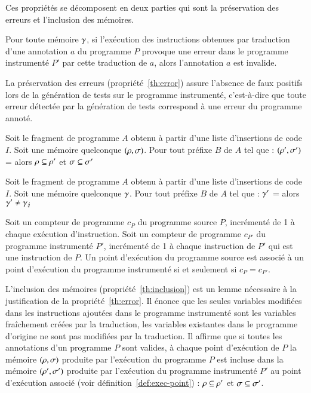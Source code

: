 Ces propriétés se décomposent en deux parties qui sont la préservation des
erreurs et l'inclusion des mémoires.

\begin{myproperty}
  \label{th:error}
  Pour toute mémoire $\gamma$, si l'exécution des instructions obtenues
  par traduction d'une annotation $a$
  du programme $P$ provoque une erreur dans le programme instrumenté $P'$ par
  cette traduction de $a$, alors l'annotation $a$ est invalide.
\end{myproperty}

La préservation des erreurs (propriété~\ref{th:error}) assure l'absence de faux
positifs lors de la génération de tests sur le programme instrumenté,
c'est-à-dire que toute erreur détectée par la génération de tests correspond à
une erreur du programme annoté.


\begin{myproperty}
  \label{th:inclusion}
  Soit le fragment de programme $A$ obtenu à partir d'une liste d'insertions de
  code $I$.
  Soit une mémoire quelconque $(\rho, \sigma)$.
  Pour tout préfixe $B$ de $A$ tel que :
  $(\rho', \sigma')$ =  alors
  $\rho \subseteq \rho'$ et $\sigma \subseteq \sigma'$
\end{myproperty}

\begin{myproperty}
  \label{lem:noerror}
  Soit le fragment de programme $A$ obtenu à partir d'une liste d'insertions de
  code $I$.
  Soit une mémoire quelconque $\gamma$.
  Pour tout préfixe $B$ de $A$ tel que :
  $\gamma'$ =  alors
  $\gamma' \neq \gamma_\lightning$
\end{myproperty}

\begin{definition}
  \label{def:exec-point}
  Soit un compteur de programme $c_P$ du programme source $P$, incrémenté de 1 à
  chaque exécution d'instruction.
  Soit un compteur de programme $c_{P'}$ du programme instrumenté $P'$,
  incrémenté de 1 à chaque instruction de $P'$ qui est une instruction de $P$.
  Un point d'exécution du programme source est associé à un point d'exécution du
  programme instrumenté si et seulement si $c_P = c_{P'}$.
\end{definition}

L'inclusion des mémoires (propriété~\ref{th:inclusion}) est un lemme
nécessaire à la justification de la propriété~\ref{th:error}.
Il énonce que les seules variables modifiées dans les instructions ajoutées dans
le programme instrumenté sont les variables fraîchement créées par la
traduction, les variables existantes dans le programme d'origine ne sont pas
modifiées par la traduction.
Il affirme que si toutes les annotations d'un programme $P$ sont valides, à
chaque point d'exécution de $P$ la mémoire $(\rho, \sigma)$ produite par
l'exécution du programme $P$ est incluse dans la mémoire $(\rho', \sigma')$
produite par l'exécution du programme instrumenté $P'$ au point d'exécution
associé (voir définition~\ref{def:exec-point}) :
$\rho \subseteq \rho'$ et $\sigma \subseteq \sigma'$.

